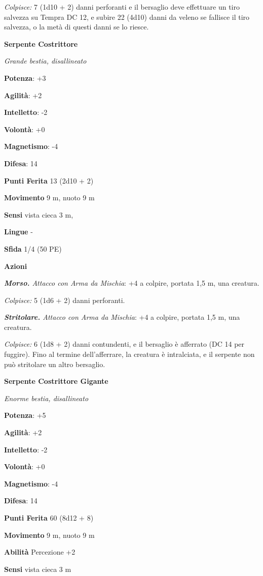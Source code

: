 \begin{multicols}{2}
\emph{Colpisce:} 7 (1d10 + 2) danni perforanti e il bersaglio deve
effettuare un tiro salvezza su Tempra DC 12, e subire 22 (4d10)
danni da veleno se fallisce il tiro salvezza, o la metà di questi danni
se lo riesce.

\textbf{Serpente Costrittore}

\emph{Grande bestia, disallineato}

\textbf{Potenza}: +3

\textbf{Agilità}: +2

\textbf{Intelletto}: -2

\textbf{Volontà}: +0

\textbf{Magnetismo}: -4

\textbf{Difesa}: 14

\textbf{Punti Ferita} 13 (2d10 + 2)

\textbf{Movimento} 9 m, nuoto 9 m

\textbf{Sensi} vista cieca 3 m, 

\textbf{Lingue} -

\textbf{Sfida} 1/4 (50 PE)

\textbf{Azioni}

\emph{\textbf{Morso.} Attacco con Arma da Mischia}: +4 a colpire,
portata 1,5 m, una creatura.

\emph{Colpisce:} 5 (1d6 + 2) danni perforanti.

\emph{\textbf{Stritolare.} Attacco con Arma da Mischia}: +4 a colpire,
portata 1,5 m, una creatura.

\emph{Colpisce:} 6 (1d8 + 2) danni contundenti, e il bersaglio è
afferrato (DC 14 per fuggire). Fino al termine dell'afferrare, la
creatura è intralciata, e il serpente non può stritolare un altro
bersaglio.

\textbf{Serpente Costrittore Gigante}

\emph{Enorme bestia, disallineato}

\textbf{Potenza}: +5

\textbf{Agilità}: +2

\textbf{Intelletto}: -2

\textbf{Volontà}: +0

\textbf{Magnetismo}: -4

\textbf{Difesa}: 14

\textbf{Punti Ferita} 60 (8d12 + 8)

\textbf{Movimento} 9 m, nuoto 9 m

\textbf{Abilità} Percezione +2

\textbf{Sensi} vista cieca 3 m


\end{multicols}

